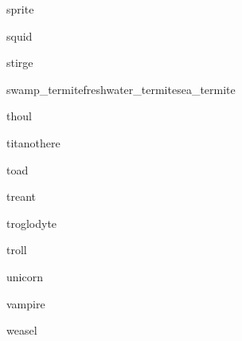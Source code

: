 \documentclass[a4paper,serif]{module}
\begin{document}
\begin{newmonster}{sprite}\end{newmonster}

\begin{newmonster}{squid}\end{newmonster}

\begin{newmonster}{stirge}\end{newmonster}


\begin{newmonster3}{swamp_termite}{freshwater_termite}{sea_termite}\end{newmonster3}

\begin{newmonster}{thoul}\end{newmonster}

\begin{newmonster}{titanothere}\end{newmonster}

\begin{newmonster}{toad}\end{newmonster}

\begin{newmonster}{treant}\end{newmonster}

\begin{newmonster}{troglodyte}\end{newmonster}

\begin{newmonster}{troll}\end{newmonster}

\begin{newmonster}{unicorn}\end{newmonster}

\begin{newmonster}{vampire}\end{newmonster}

\begin{newmonster}{weasel}\end{newmonster}
\end{document}
